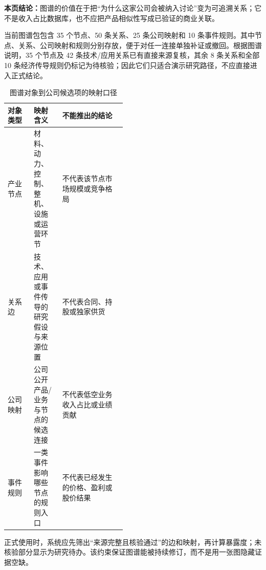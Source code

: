 
\textbf{本页结论：}图谱的价值在于把“为什么这家公司会被纳入讨论”变为可追溯关系；它不是收入占比数据库，也不应把产品相似性写成已验证的商业关联。

当前图谱包包含 35 个节点、50 条关系、25 条公司映射和 10 条事件规则\cite{wty-repo-graph}。其中节点、关系、公司映射和规则分别存放，便于对任一连接单独补证或撤回。根据图谱说明，35 个节点及 42 条技术/应用关系已有直接来源复核，其余 8 条关系和全部 10 条经济传导规则仍标记为待核验；因此它们只适合演示研究路径，不应直接进入正式结论。

\begin{table}[htbp]
\centering
\caption{图谱对象到公司候选项的映射口径}
\label{tab:wty-graph-mapping}
\small
\begin{tabularx}{\linewidth}{p{0.22\linewidth}p{0.24\linewidth}X}
\toprule
对象类型 & 映射含义 & 不能推出的结论 \\
\midrule
产业节点 & 材料、动力、控制、整机、设施或运营环节 & 不代表该节点市场规模或竞争格局 \\
关系边 & 技术、应用或事件传导的研究假设与来源位置 & 不代表合同、持股或独家供货 \\
公司映射 & 公司公开产品/业务与节点的候选连接 & 不代表低空业务收入占比或业绩贡献 \\
事件规则 & 一类事件影响哪些节点的规则入口 & 不代表已经发生的价格、盈利或股价结果 \\
\bottomrule
\end{tabularx}
\end{table}

正式使用时，系统应先筛出“来源完整且核验通过”的边和映射，再计算暴露度；未核验部分显示为研究待办。该约束保证图谱能被持续修订，而不是用一张图隐藏证据空缺。
